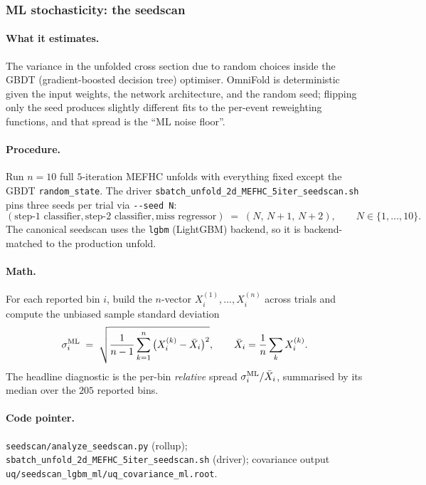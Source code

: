 \subsubsection{ML stochasticity: the seedscan}
\label{sec:seedscan}

\paragraph{What it estimates.}
The variance in the unfolded cross section due to random choices
inside the GBDT (gradient-boosted decision tree) optimiser. OmniFold
is deterministic given the input weights, the network architecture,
and the random seed; flipping only the seed produces slightly
different fits to the per-event reweighting functions, and that
spread is the ``ML noise floor''.

\paragraph{Procedure.}
Run $n=10$ full $5$-iteration MEFHC unfolds with everything fixed
except the GBDT \texttt{random\_state}. The driver
\texttt{sbatch\_unfold\_2d\_MEFHC\_5iter\_seedscan.sh} pins three
seeds per trial via \texttt{-{}-seed N}:
\begin{equation}
(\text{step-1 classifier},\text{step-2 classifier},\text{miss regressor})
\;=\;
(N,\,N+1,\,N+2),
\qquad N \in \{1,\dots,10\}.
\end{equation}
The canonical seedscan uses the \texttt{lgbm} (LightGBM) backend, so
it is backend-matched to the production unfold.

\paragraph{Math.}
For each reported bin $i$, build the $n$-vector $X_{i}^{(1)},\dots,
X_{i}^{(n)}$ across trials and compute the unbiased sample standard
deviation
\begin{equation}
\sigma^{\text{ML}}_{i}
\;=\;
\sqrt{\frac{1}{n-1}\sum_{k=1}^{n}\big(X^{(k)}_{i}-\bar X_{i}\big)^{2}},
\qquad
\bar X_{i} = \frac{1}{n}\sum_{k} X^{(k)}_{i}.
\end{equation}
The headline diagnostic is the per-bin \emph{relative} spread
$\sigma^{\text{ML}}_{i}/\bar X_{i}$, summarised by its median over the
$205$ reported bins.

\paragraph{Code pointer.}
\texttt{seedscan/analyze\_seedscan.py} (rollup);
\texttt{sbatch\_unfold\_2d\_MEFHC\_5iter\_seedscan.sh} (driver);
covariance output \texttt{uq/seedscan\_lgbm\_ml/uq\_covariance\_ml.root}.

